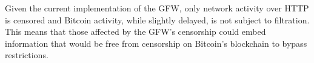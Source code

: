 Given the current implementation of the GFW, only network activity over HTTP is censored and Bitcoin activity, while slightly delayed, is not subject to filtration. 
This means that those affected by the GFW's censorship could embed information that would be free from censorship on Bitcoin's blockchain to bypass restrictions.
